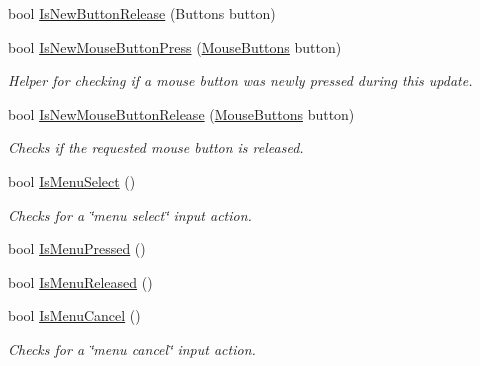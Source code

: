 \begin{DoxyCompactItemize}
bool \hyperlink{classgearit_1_1xna_1_1_input_helper_a93dc1495cf6f6f1728ae31c96f07ebe0}{Is\+New\+Button\+Release} (Buttons button)
\item 
bool \hyperlink{classgearit_1_1xna_1_1_input_helper_a11634e81606e1763b1c712dc4a8252c6}{Is\+New\+Mouse\+Button\+Press} (\hyperlink{namespacegearit_1_1xna_a41534985797a7c3fd3cad9ed9543d57b}{Mouse\+Buttons} button)
\begin{DoxyCompactList}\small\item\em Helper for checking if a mouse button was newly pressed during this update. \end{DoxyCompactList}\item 
bool \hyperlink{classgearit_1_1xna_1_1_input_helper_a005c5b75c38aacaa8d3cd77a506aeb02}{Is\+New\+Mouse\+Button\+Release} (\hyperlink{namespacegearit_1_1xna_a41534985797a7c3fd3cad9ed9543d57b}{Mouse\+Buttons} button)
\begin{DoxyCompactList}\small\item\em Checks if the requested mouse button is released. \end{DoxyCompactList}\item 
bool \hyperlink{classgearit_1_1xna_1_1_input_helper_ac81ca12c6f1040712e1baa7910e02400}{Is\+Menu\+Select} ()
\begin{DoxyCompactList}\small\item\em Checks for a \char`\"{}menu select\char`\"{} input action. \end{DoxyCompactList}\item 
bool \hyperlink{classgearit_1_1xna_1_1_input_helper_a7ac8b2d18d752b5f6a106892042892aa}{Is\+Menu\+Pressed} ()
\item 
bool \hyperlink{classgearit_1_1xna_1_1_input_helper_a6c319d2f4aebe9c3e90c3a54caa0c050}{Is\+Menu\+Released} ()
\item 
bool \hyperlink{classgearit_1_1xna_1_1_input_helper_a0177585321b324b5e4ff24eca10adabc}{Is\+Menu\+Cancel} ()
\begin{DoxyCompactList}\small\item\em Checks for a \char`\"{}menu cancel\char`\"{} input action. \end{DoxyCompactList}\end{DoxyCompactItemize}
